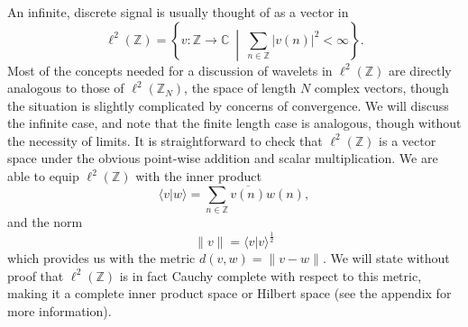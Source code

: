 \documentclass{report}
\newcommand{\Z}{\mathbb{Z}}
\newcommand{\C}{\mathbb{C}}
\newcommand{\ltoo}{\ensuremath{\ell^2 \left( \Z_{N} \right )}}
\newcommand{\F}{\mathcal{F}}
\begin{document}

An infinite, discrete signal is usually thought of as a vector in 
$$
\ell^2 (\Z)=\left \{ v: \Z \to \C \ \middle | \ \sum_{n\in \Z} |v(n)|^2 < \infty \right \}.
$$
Most of the concepts needed for a discussion of wavelets in $\ell^2 (\Z)$ are directly analogous to those of $\ltoo$, the space of length $N$ complex vectors, though the situation is slightly complicated by concerns of convergence. We will discuss the infinite case, and note that the finite length case is analogous, though without the necessity of limits. It is straightforward to check that $\ell^2 (\Z)$ is a vector space under the obvious point-wise addition and scalar multiplication. We are able to equip $\ell^2 (\Z)$ with the inner product
$$
\langle v | w \rangle = \sum_{n \in \Z} \overline{v(n)}w(n),
$$
and the norm
$$
\|v\|=\langle v | v \rangle^\frac{1}{2}
$$
which provides us with the metric $d(v,w)=\|v-w\|$. We will state without proof that $\ell^2 (\Z)$ is in fact Cauchy complete with respect to this metric, making it a complete inner product space or Hilbert space (see the appendix for more information).
\end{document}
